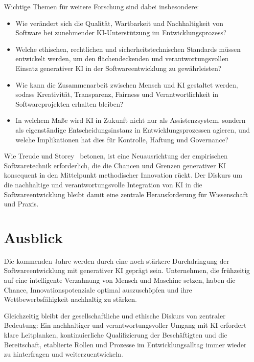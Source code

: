 Wichtige Themen für weitere Forschung sind dabei insbesondere:
\begin{itemize}
      \item Wie verändert sich die Qualität, Wartbarkeit und Nachhaltigkeit von Software
            bei zunehmender KI-Unterstützung im Entwicklungsprozess?
      \item Welche ethischen, rechtlichen und sicherheitstechnischen Standards müssen
            entwickelt werden, um den flächendeckenden und verantwortungsvollen Einsatz
            generativer KI in der Softwareentwicklung zu gewährleisten?
      \item Wie kann die Zusammenarbeit zwischen Mensch und KI gestaltet werden, sodass
            Kreativität, Transparenz, Fairness und Verantwortlichkeit in Softwareprojekten
            erhalten bleiben?
      \item In welchem Maße wird KI in Zukunft nicht nur als Assistenzsystem, sondern als
            eigenständige Entscheidungsinstanz in Entwicklungsprozessen agieren, und welche
            Implikationen hat dies für Kontrolle, Haftung und Governance?
\end{itemize}

Wie Treude und Storey~\cite{treude_generative_2025} betonen, ist eine
Neuausrichtung der empirischen Softwaretechnik erforderlich, die die Chancen
und Grenzen generativer KI konsequent in den Mittelpunkt methodischer
Innovation rückt. Der Diskurs um die nachhaltige und verantwortungsvolle
Integration von KI in die Softwareentwicklung bleibt damit eine zentrale
Herausforderung für Wissenschaft und Praxis.

\section{Ausblick}

Die kommenden Jahre werden durch eine noch stärkere Durchdringung der
Softwareentwicklung mit generativer KI geprägt sein. Unternehmen, die
frühzeitig auf eine intelligente Verzahnung von Mensch und Maschine setzen,
haben die Chance, Innovationspotenziale optimal auszuschöpfen und ihre
Wettbewerbsfähigkeit nachhaltig zu stärken.

Gleichzeitig bleibt der gesellschaftliche und ethische Diskurs von zentraler
Bedeutung: Ein nachhaltiger und verantwortungsvoller Umgang mit KI erfordert
klare Leitplanken, kontinuierliche Qualifizierung der Beschäftigten und die
Bereitschaft, etablierte Rollen und Prozesse im Entwicklungsalltag immer wieder
zu hinterfragen und weiterzuentwickeln.

